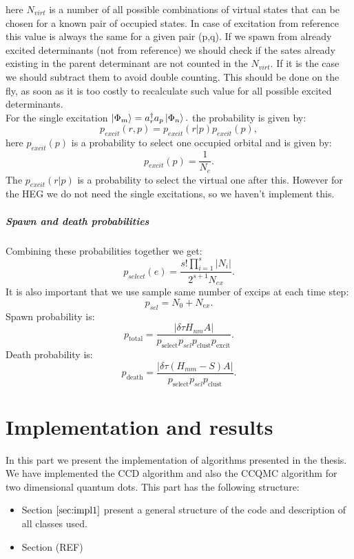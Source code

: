 \documentclass[twoside,english]{uiofysmaster}
\theoremstyle{definition}
\begin{document}
here $N_{virt}$ is a number of all possible combinations of virtual states that can be chosen for a known pair of occupied states. In case of excitation from reference this value is always the same for a given pair (p,q). If we spawn from already excited determinants (not from reference) we should check if the sates already existing in the parent determinant are not counted in the  $N_{virt}$. If it is the case we should subtract them to avoid double counting. This should be done on the fly, as soon as it is too costly to recalculate such value for all possible excited determinants.\\
For the single excitation $ \ket{\Phi_{m}}=a^\dagger_r a_p \ket{\Phi_n}.$  the probability is given by:
\begin{equation}
p_{excit}(r,p) = p_{excit}(r|p)p_{excit}(p),
\end{equation}
here $p_{excit}(p)$ is a probability to select one occupied orbital and is given by:
\begin{equation}
p_{excit}(p)=\frac{1}{N_e}.
\end{equation}
The $ p_{excit}(r|p)$ is a probability to select the virtual one after this. 
However for the HEG we do not need the single excitations, so we haven't implement this.

\subsubsection{Spawn and death probabilities}
Combining these probabilities together we get:
\begin{equation}
p_{select}(e)= \frac{s!\prod_{i=1}^{s} |N_i|}{2^{s+1}N_{ex}}.
\end{equation}
It is also important that we use sample same number of excips at each time step:
\begin{equation}
p_{sel}= N_0+N_{ex}.
\end{equation}
Spawn probability is:
\begin{equation}
p_{\text{total}} = \frac{|\delta \tau H_{nm}A|}{p_{\text{select}}p_{sel}p_{\text{clust}}p_{\text{excit}}}. 
\end{equation} 
Death probability is: 
\begin{equation}
p_{\text{death}} = \frac{|\delta \tau (H_{mm} - S)A|}{p_{\text{select}}p_{sel}p_{\text{clust}}}.
\end{equation}

\part{Implementation and results}
In this part we present the implementation of algorithms presented in the thesis. We have implemented the CCD algorithm and also the CCQMC algorithm for two dimensional quantum dots. 
This part has the following structure:\\
\begin{itemize}
\item Section $\ref{sec:impl1}$ present a general structure of the code and description of all classes used.
\item Section (REF) 
\end{itemize}
\end{document}
